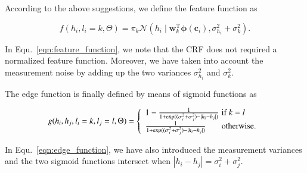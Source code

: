 According to the above suggestions, we define the feature function as

\begin{equation}
\label{eqn:feature_function}
f(h_i,l_i=k,\Theta)=\pi_k\mathcal{N}(h_i\mid\mathbf{w}_k^\text{T}
\boldsymbol{\phi}(\mathbf{c}_i), \sigma^2_{h_i} + \sigma^2_k).
\end{equation}

In Equ.~\eqref{eqn:feature_function}, we note that the CRF does not required a
normalized feature function. Moreover, we have taken into account the
measurement noise by adding up the two variances $\sigma^2_{h_i}$ and
$\sigma^2_{k}$.

The edge function is finally defined by means of sigmoid functions as

\begin{equation}
\label{eqn:edge_function}
g(h_i,h_j,l_i=k,l_j=l,\Theta)= \left\{
\begin{array}{l l}
1-\frac{1}{1+\exp((\sigma^2_i+\sigma^2_j)-|h_i-h_j|)} & \quad \hspace{-0.6cm}
\text{if $k=l$}\\
\frac{1}{1+\exp((\sigma^2_i+\sigma^2_j)-|h_i-h_j|)} & \quad \hspace{-0.6cm}
\text{otherwise}.
\end{array} \right.
\end{equation}

In Equ.~\eqref{eqn:edge_function}, we have also introduced the measurement
variances and the two sigmoid functions intersect when $|h_i-h_j|=
\sigma^2_i+\sigma^2_j$.
